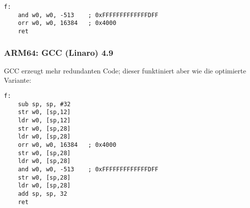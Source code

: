 \begin{lstlisting}[caption=\Optimizing GCC (Linaro) 4.9,style=customasmARM]
f:
	and	w0, w0, -513	; 0xFFFFFFFFFFFFFDFF
	orr	w0, w0, 16384	; 0x4000
	ret
\end{lstlisting}

\subsubsection{ARM64: \NonOptimizing GCC (Linaro) 4.9}

\NonOptimizing GCC erzeugt mehr redundanten Code; dieser funktiniert aber wie
die optimierte Variante:

\begin{lstlisting}[caption=\NonOptimizing GCC (Linaro) 4.9,style=customasmARM]
f:
	sub	sp, sp, #32
	str	w0, [sp,12]
	ldr	w0, [sp,12]
	str	w0, [sp,28]
	ldr	w0, [sp,28]
	orr	w0, w0, 16384	; 0x4000
	str	w0, [sp,28]
	ldr	w0, [sp,28]
	and	w0, w0, -513	; 0xFFFFFFFFFFFFFDFF
	str	w0, [sp,28]
	ldr	w0, [sp,28]
	add	sp, sp, 32
	ret
\end{lstlisting}
